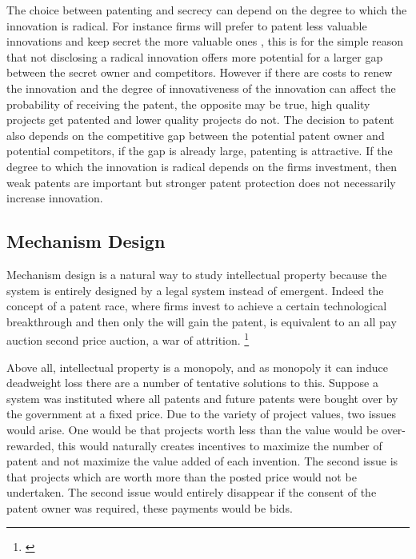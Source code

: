 \documentclass[12pt]{article}
\numberwithin{equation}{section}
\begin{document}
The choice between patenting and secrecy can depend on the degree to which the innovation is radical. For instance firms will prefer to patent less valuable innovations and keep secret the more valuable ones \cite{Anton2004} , this is for the simple reason that not disclosing a radical innovation offers more potential for a larger gap between the secret owner and competitors. However if there are costs to renew the innovation and the degree of innovativeness of the innovation can affect the probability of receiving the patent, the opposite may be true, high quality projects get patented and lower quality projects do not\cite{Mose2011}. The decision to patent also depends on the competitive gap between the potential patent owner and potential competitors, if the gap is already large, patenting is attractive. If the degree to which the innovation is radical depends on the firms investment, then weak patents are important but stronger patent protection does not necessarily increase innovation\cite{Kultti2006}. %



\subsection{Mechanism Design}

Mechanism design is a natural way to study intellectual property because the system is entirely designed by a legal system instead of emergent. Indeed the concept of a patent race, where firms invest to achieve a certain technological breakthrough and then only the will gain the patent, is equivalent to an all pay auction second price auction, a war of attrition. \footnote{ \cite{Games2003} }

Above all, intellectual property is a monopoly, and as monopoly it can induce deadweight loss there are a number of tentative solutions to this. Suppose a system was instituted where all patents and future patents were bought over by the government at a fixed price. Due to the variety of project values, two issues would arise. One would be that projects worth less than the value would be over-rewarded, this would naturally creates incentives to maximize the number of patent and not maximize the value added of each invention. The second issue is that projects which are worth more than the posted price would not be undertaken. The second issue would entirely disappear if the consent of the patent owner was required, these payments would be bids.  
\end{document}
